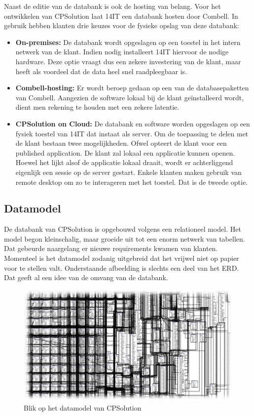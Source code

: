 Naast de editie van de databank is ook de hosting van belang. Voor het ontwikkelen van CPSolution laat 14IT een databank hosten door Combell. In gebruik hebben klanten drie keuzes voor de fysieke opslag van deze databank:

\begin{itemize}
	\item \textbf{On-premises:} De databank wordt opgeslagen op een toestel in het intern netwerk van de klant. Indien nodig installeert 14IT hiervoor de nodige hardware. Deze optie vraagt dus een zekere investering van de klant, maar heeft als voordeel dat de data heel snel raadpleegbaar is.
	\item \textbf{Combell-hosting:} Er wordt beroep gedaan op een van de databasepaketten van Combell. Aangezien de software lokaal bij de klant geïnstalleerd wordt, dient men rekening te houden met een zekere latentie.
	\item \textbf{CPSolution on Cloud:} De databank en software worden opgeslagen op een fysiek toestel van 14IT dat instaat als server. Om de toepassing te delen met de klant bestaan twee mogelijkheden. Ofwel opteert de klant voor een published application. De klant zal lokaal een applicatie kunnen openen. Hoewel het lijkt alsof de applicatie lokaal draait, wordt er achterliggend eigenlijk een sessie op de server gestart. Enkele klanten maken gebruik van remote desktop om zo te interageren met het toestel. Dat is de tweede optie.
\end{itemize}

\subsection{Datamodel}
\label{sub:datamodel}

De databank van CPSolution is opgebouwd volgens een relationeel model. Het model begon kleinschalig, maar groeide uit tot een enorm netwerk van tabellen. Dat gebeurde naargelang er nieuwe requirements kwamen van klanten. Momenteel is het datamodel zodanig uitgebreid dat het vrijwel niet op papier voor te stellen valt. Onderstaande afbeelding is slechts een deel van het ERD. Dat geeft al een idee van de omvang van de databank.

\begin{figure}[H]
	\centering
	\includegraphics[width=0.6\linewidth]{img/cpsolution/cpsolution-dbml.png}
	\caption{\label{fig:cpsolution-dbml}Blik op het datamodel van CPSolution}
\end{figure}


